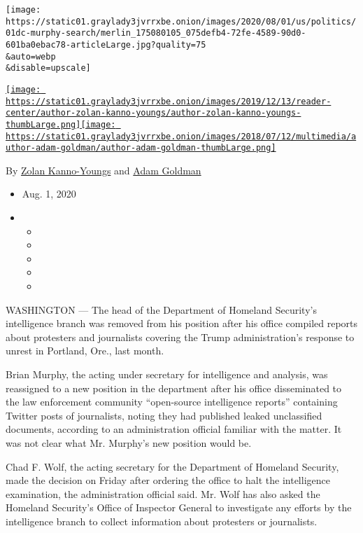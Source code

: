 \texttt{[image: https://static01.graylady3jvrrxbe.onion/images/2020/08/01/us/politics/01dc-murphy-search/merlin\_175080105\_075defb4-72fe-4589-90d0-601ba0ebac78-articleLarge.jpg?quality=75\\\&auto=webp\\\&disable=upscale]}

\href{https://www.nytimes3xbfgragh.onion/by/zolan-kanno-youngs}{\texttt{[image: https://static01.graylady3jvrrxbe.onion/images/2019/12/13/reader-center/author-zolan-kanno-youngs/author-zolan-kanno-youngs-thumbLarge.png]}}\href{https://www.nytimes3xbfgragh.onion/by/adam-goldman}{\texttt{[image: https://static01.graylady3jvrrxbe.onion/images/2018/07/12/multimedia/author-adam-goldman/author-adam-goldman-thumbLarge.png]}}

By \href{https://www.nytimes3xbfgragh.onion/by/zolan-kanno-youngs}{Zolan
Kanno-Youngs} and
\href{https://www.nytimes3xbfgragh.onion/by/adam-goldman}{Adam Goldman}

\begin{itemize}
\item
  Aug. 1, 2020
\item
  \begin{itemize}
  \item
  \item
  \item
  \item
  \item
  \end{itemize}
\end{itemize}

WASHINGTON --- The head of the Department of Homeland Security's
intelligence branch was removed from his position after his office
compiled reports about protesters and journalists covering the Trump
administration's response to unrest in Portland, Ore., last month.

Brian Murphy, the acting under secretary for intelligence and analysis,
was reassigned to a new position in the department after his office
disseminated to the law enforcement community ``open-source intelligence
reports'' containing Twitter posts of journalists, noting they had
published leaked unclassified documents, according to an administration
official familiar with the matter. It was not clear what Mr. Murphy's
new position would be.

Chad F. Wolf, the acting secretary for the Department of Homeland
Security, made the decision on Friday after ordering the office to halt
the intelligence examination, the administration official said. Mr. Wolf
has also asked the Homeland Security's Office of Inspector General to
investigate any efforts by the intelligence branch to collect
information about protesters or journalists.

